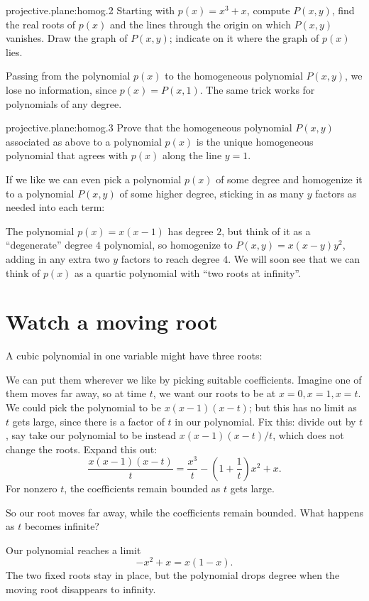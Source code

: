 \begin{problem}{projective.plane:homog.2}
Starting with \(p(x)=x^3+x\), compute \(P(x,y)\), find the real roots of \(p(x)\) and the lines through the origin on which \(P(x,y)\) vanishes.
Draw the graph of \(P(x,y)\); indicate on it where the graph of \(p(x)\) lies.
\end{problem}
Passing from the polynomial \(p(x)\) to the homogeneous polynomial \(P(x,y)\), we lose no information, since \(p(x)=P(x,1)\).
The same trick works for polynomials of any degree.
\begin{problem}{projective.plane:homog.3}
Prove that the homogeneous polynomial \(P(x,y)\) associated as above to a polynomial \(p(x)\) is the unique homogeneous polynomial that agrees with \(p(x)\) along the line \(y=1\).
\end{problem}
If we like we can even pick a polynomial \(p(x)\) of some degree and homogenize it to a polynomial \(P(x,y)\) of some higher degree, sticking in as many \(y\) factors as needed into each term:
\begin{example}
The polynomial \(p(x)=x(x-1)\) has degree \(2\), but think of it as a ``degenerate'' degree \(4\) polynomial, so homogenize to \(P(x,y)=x(x-y)y^2\), adding in any extra two \(y\) factors to reach degree \(4\).
We will soon see that we can think of \(p(x)\) as a quartic polynomial with ``two roots at infinity''.
\end{example}
\section{Watch a moving root}
A cubic polynomial in one variable might have three roots:
\begin{center}

\end{center}
We can put them wherever we like by picking suitable coefficients.
Imagine one of them moves far away, so at time \(t\), we want our roots to be at \(x=0,x=1,x=t\).
We could pick the polynomial to be \(x(x-1)(x-t)\); but this has no limit as \(t\) gets large, 
since there is a factor of \(t\) in our polynomial.
Fix this: divide out by \(t\), say take our polynomial to be instead \(x(x-1)(x-t)/t\), which does not change the roots.
Expand this out:
\[
\frac{x(x-1)(x-t)}{t}=\frac{x^3}{t}-\left(1+\frac{1}{t}\right)x^2+x.
\]
For nonzero \(t\), the coefficients remain bounded as \(t\) gets large.
\begin{center}

\end{center}
So our root moves far away, while the coefficients remain bounded.
What happens as \(t\) becomes infinite?
\begin{center}

\end{center}
Our polynomial reaches a limit
\[
-x^2+x=x(1-x).
\]
The two fixed roots stay in place, but the polynomial drops degree when the moving root disappears to infinity.
